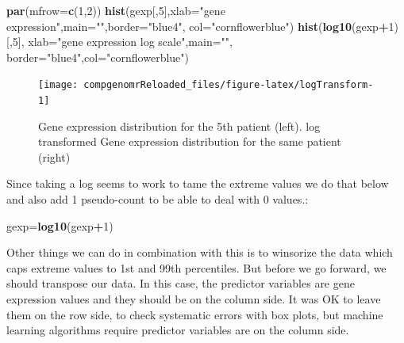 \documentclass[12pt,]{krantz}
\newenvironment{Shaded}{\begin{snugshade}}{\end{snugshade}}
\newcommand{\DataTypeTok}[1]{\textcolor[rgb]{0.13,0.29,0.53}{#1}}
\newcommand{\DecValTok}[1]{\textcolor[rgb]{0.00,0.00,0.81}{#1}}
\newcommand{\KeywordTok}[1]{\textcolor[rgb]{0.13,0.29,0.53}{\textbf{#1}}}
\newcommand{\NormalTok}[1]{#1}
\newcommand{\OperatorTok}[1]{\textcolor[rgb]{0.81,0.36,0.00}{\textbf{#1}}}
\newcommand{\StringTok}[1]{\textcolor[rgb]{0.31,0.60,0.02}{#1}}
\begin{document}
\begin{Shaded}
\begin{Highlighting}[]
\KeywordTok{par}\NormalTok{(}\DataTypeTok{mfrow=}\KeywordTok{c}\NormalTok{(}\DecValTok{1}\NormalTok{,}\DecValTok{2}\NormalTok{))}
\KeywordTok{hist}\NormalTok{(gexp[,}\DecValTok{5}\NormalTok{],}\DataTypeTok{xlab=}\StringTok{"gene expression"}\NormalTok{,}\DataTypeTok{main=}\StringTok{""}\NormalTok{,}\DataTypeTok{border=}\StringTok{"blue4"}\NormalTok{,}
     \DataTypeTok{col=}\StringTok{"cornflowerblue"}\NormalTok{)}
\KeywordTok{hist}\NormalTok{(}\KeywordTok{log10}\NormalTok{(gexp}\OperatorTok{+}\DecValTok{1}\NormalTok{)[,}\DecValTok{5}\NormalTok{], }\DataTypeTok{xlab=}\StringTok{"gene expression log scale"}\NormalTok{,}\DataTypeTok{main=}\StringTok{""}\NormalTok{,}
     \DataTypeTok{border=}\StringTok{"blue4"}\NormalTok{,}\DataTypeTok{col=}\StringTok{"cornflowerblue"}\NormalTok{)}
\end{Highlighting}
\end{Shaded}

\begin{figure}

{\centering \texttt{[image: compgenomrReloaded\_files/figure-latex/logTransform-1]} 

}

\caption{Gene expression distribution for the 5th patient (left). log transformed Gene expression distribution for the same patient (right)}\label{fig:logTransform}
\end{figure}

Since taking a log seems to work to tame the extreme values we do that below and also add 1 pseudo-count to be able to deal with 0 values.:

\begin{Shaded}
\begin{Highlighting}[]
\NormalTok{gexp=}\KeywordTok{log10}\NormalTok{(gexp}\OperatorTok{+}\DecValTok{1}\NormalTok{)}
\end{Highlighting}
\end{Shaded}

Other things we can do in combination with this is to winsorize the data which caps extreme values to 1st and 99th percentiles. But before we go forward, we should transpose our data. In this case, the predictor variables are gene expression values and they should be on the column side. It was OK to leave them on the row side, to check systematic errors with box plots, but machine learning algorithms require predictor variables are on the column side.
\end{document}
